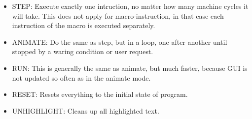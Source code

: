     \begin{itemize}
        \item STEP: Execute exactly one intruction, no matter how many machine cycles it will take. This does not apply for macro-instruction, in that case each instruction of the macro is executed separately.
        \item ANIMATE: Do the same as step, but in a loop, one after another until stopped by a waring condition or user request.
        \item RUN: This is generally the same as animate, but much faster, because GUI is not updated so often as in the animate mode.
        \item RESET: Resets everything to the initial state of program.
        \item UNHIGHLIGHT: Cleans up all highlighted text.
    \end{itemize}
